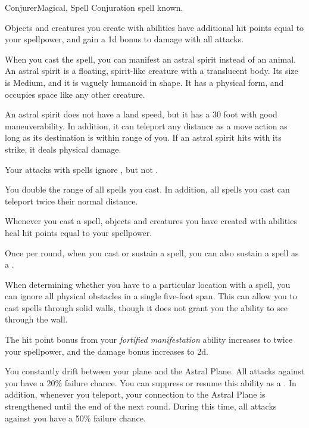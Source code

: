     \begin{feat}{Conjurer}{Magical, Spell}
        \featpre Conjuration spell known.

         Objects and creatures you create with  abilities have additional hit points equal to your spellpower, and gain a \plus1d bonus to damage with all attacks.

         When you cast the  spell, you can manifest an astral spirit instead of an animal.
        An astral spirit is a floating, spirit-like creature with a translucent body.
        Its size is Medium, and it is vaguely humanoid in shape.
        It has a physical form, and occupies space like any other creature.

        An astral spirit does not have a land speed, but it has a 30 foot  with good maneuverability.
        In addition, it can teleport any distance as a move action as long as its destination is within \rngmed range of you.
        If an astral spirit hits with its strike, it deals physical damage.

         Your attacks with spells ignore , but not .

         You double the range of all spells you cast.
        In addition, all  spells you cast can teleport twice their normal distance.

         Whenever you cast a spell, objects and creatures you have created with  abilities heal hit points equal to your spellpower.

         Once per round, when you cast or sustain a spell, you can also sustain a  spell as a .

         When determining whether you have  to a particular location with a spell, you can ignore all physical obstacles in a single five-foot span.
        This can allow you to cast spells through solid walls, though it does not grant you the ability to see through the wall.

         The hit point bonus from your \textit{fortified manifestation} ability increases to twice your spellpower, and the damage bonus increases to \plus2d.

        \ff[17]{} 

         You constantly drift between your plane and the Astral Plane.
        All attacks against you have a 20\% failure chance.
        You can suppress or resume this ability as a .
        In addition, whenever you teleport, your connection to the Astral Plane is strengthened until the end of the next round.
        During this time, all attacks against you have a 50\% failure chance.
    \end{feat}

